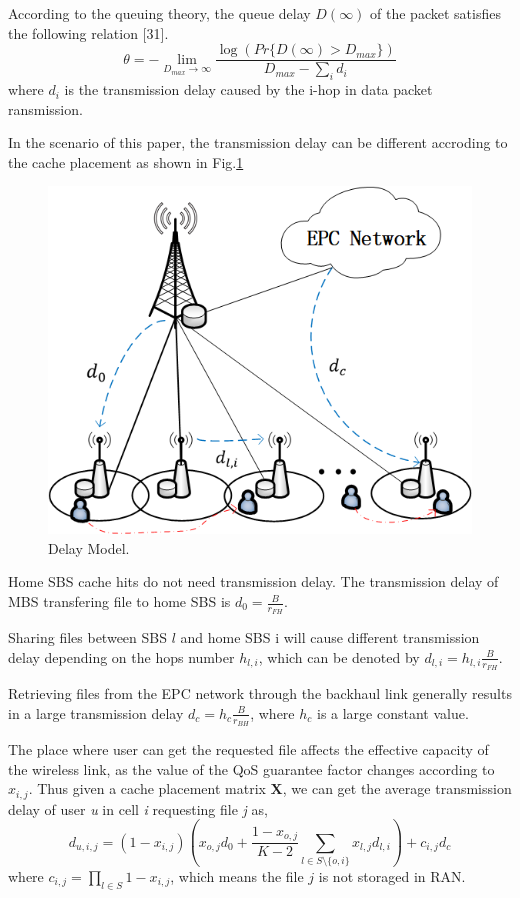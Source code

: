 \documentclass[conference]{IEEEtran}
\begin{document}
According to the queuing theory, the queue delay $D(\infty)$ of the packet satisfies the following relation [31].
\begin{equation}
\theta=-\lim_{D_{max}\to \infty}\frac{\log(Pr\{D(\infty)>D_{max}\})}{D_{max}-\sum_i d_i}
\end{equation}
where $d_i$ is the transmission delay caused by the i-hop in data packet ransmission.

In the scenario of this paper, the transmission delay can be different accroding to the cache placement as shown in Fig.\ref{fig 2}
\begin{figure}[htbp]
 \centerline{\includegraphics[scale=0.5]{fig2.png}}
 \caption{Delay Model.}
 \label{fig 2}
\end{figure}

Home SBS cache hits do not need transmission delay. The transmission delay of MBS transfering file to home SBS is $d_0=\frac{B}{r_{FH}}$.

 Sharing files between SBS $l$ and home SBS i will cause different transmission delay depending on the hops number $h_{l,i}$, which can be denoted by $d_{l,i}=h_{l,i}\frac{B}{r_{FH}}$.

Retrieving files from the EPC network through the backhaul link generally results in a large transmission delay $d_c=h_c\frac{B}{r_{BH}}$, where $h_c$ is a large constant value.

The place where user can get the requested file affects the effective capacity of the wireless link, as the value of the QoS guarantee factor changes according to $x_{i,j}$. Thus given a cache placement matrix $\mathbf{X}$, we can get the average transmission delay of user \emph{u} in cell \emph{i} requesting file \emph{j} as,
\begin{equation}
d_{u,i,j}=(1-x_{i,j})(x_{o,j}d_0+\frac{1-x_{o,j}}{K-2}\sum_{l\in S\setminus{\{o,i\}}}x_{l,j}d_{l,i})+c_{i,j}d_c
\end{equation}
where $c_{i,j}= \prod_{l\in S}1-x_{i,j}$, which means the file $j$ is not storaged in RAN.
\end{document}
